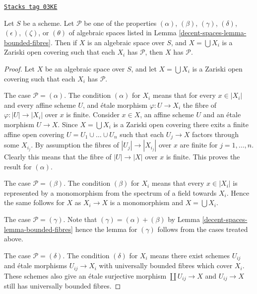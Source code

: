 \begin{lemma}
\label{decent-spaces-lemma-properties-local}
\href{https://stacks.math.columbia.edu/tag/03KE}{\texttt{Stacks tag 03KE}}

Let $S$ be a scheme.
Let $\mathcal{P}$ be one of the properties
$(\alpha)$, $(\beta)$, $(\gamma)$, $(\delta)$, $(\epsilon)$, $(\zeta)$, or
$(\theta)$ of algebraic spaces listed in
Lemma \ref{decent-spaces-lemma-bounded-fibres}.
Then if $X$ is an algebraic space over $S$, and $X = \bigcup X_i$ is a
Zariski open covering such that each $X_i$ has $\mathcal{P}$,
then $X$ has $\mathcal{P}$.
\end{lemma}

\begin{proof}
Let $X$ be an algebraic space over $S$, and let $X = \bigcup X_i$ is a
Zariski open covering such that each $X_i$ has $\mathcal{P}$.

\medskip\noindent
The case $\mathcal{P} = (\alpha)$. The condition $(\alpha)$ for $X_i$
means that for every $x \in |X_i|$ and every affine scheme $U$, and
\'etale morphism $\varphi : U \to X_i$ the fibre of $\varphi : |U| \to |X_i|$
over $x$ is finite. Consider $x \in X$, an affine scheme $U$ and
an \'etale morphism $U \to X$. Since $X = \bigcup X_i$ is a
Zariski open covering there exits a finite affine open covering
$U = U_1 \cup \ldots \cup U_n$ such that each $U_j \to X$ factors through
some $X_{i_j}$. By assumption the fibres of $|U_j | \to |X_{i_j}|$
over $x$ are finite for $j = 1, \ldots, n$. Clearly this means that
the fibre of $|U| \to |X|$ over $x$ is finite.
This proves the result for $(\alpha)$.

\medskip\noindent
The case $\mathcal{P} = (\beta)$. The condition $(\beta)$ for $X_i$ means
that every $x \in |X_i|$ is represented by a monomorphism from the
spectrum of a field towards $X_i$. Hence the same follows for $X$
as $X_i \to X$ is a monomorphism and $X = \bigcup X_i$.

\medskip\noindent
The case $\mathcal{P} = (\gamma)$.
Note that $(\gamma) = (\alpha) + (\beta)$ by
Lemma \ref{decent-spaces-lemma-bounded-fibres}
hence the lemma for $(\gamma)$ follows from the cases treated above.

\medskip\noindent
The case $\mathcal{P} = (\delta)$. The condition $(\delta)$ for $X_i$ means
there exist schemes $U_{ij}$ and \'etale morphisms $U_{ij} \to X_i$ with
universally bounded fibres which cover $X_i$. These schemes also give an
\'etale surjective morphism $\coprod U_{ij} \to X$ and $U_{ij} \to X$
still has universally bounded fibres.


\end{proof}
